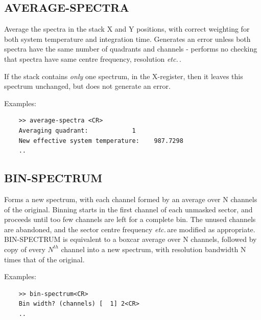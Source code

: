 \documentclass[11pt,twoside]{report}
\newcommand{\etc}{{\it etc.\,}}
\begin{document}
\subsection{AVERAGE-SPECTRA}

Average the spectra in the stack X and Y positions, with correct weighting
for both system temperature and integration time. Generates an error unless
both spectra have the same number of quadrants and channels - performs no
checking that spectra have same centre frequency, resolution \etc.

If the stack contains {\em only} one spectrum, in the X-register, then it
leaves this spectrum unchanged, but does not generate an error.

Examples:
\begin{verbatim}
    >> average-spectra <CR>
    Averaging quadrant:            1
    New effective system temperature:    987.7298
    ..
\end{verbatim}

\subsection{BIN-SPECTRUM} 

Forms a new spectrum, with each channel formed by an average over N channels of
the original. Binning starts in the first channel of each unmasked sector, and
proceeds until too few channels are left for a complete bin. The unused
channels are abandoned, and the sector centre frequency \etc are modified as
appropriate. BIN-SPECTRUM is equivalent to a boxcar average over N channels,
followed by copy of every $N^{th}$ channel into a new spectrum, with resolution
bandwidth N times that of the original.

Examples:
\begin{verbatim}
    >> bin-spectrum<CR>
    Bin width? (channels) [  1] 2<CR>
    ..
\end{verbatim}
\end{document}
